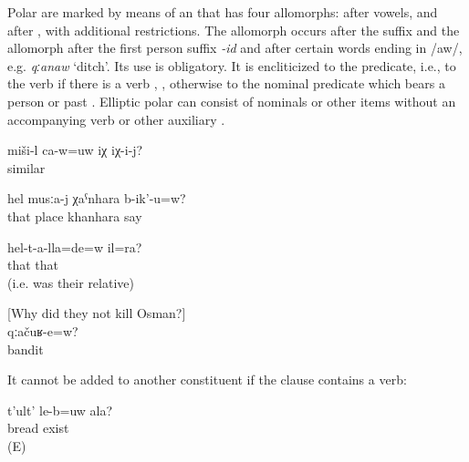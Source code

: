 Polar  are marked by means of an  that has four allomorphs:  after vowels, and  after , with additional restrictions. The allomorph  occurs after the  suffix  and the allomorph  after the first person suffix \textit{-id} and after certain words ending in /aw/, e.g. \textit{qːanaw} `ditch'. Its use is obligatory. It is encliticized to the predicate, i.e., to the verb if there is a verb , , otherwise to the nominal predicate which bears a person or past  . Elliptic polar  can consist of nominals or other items without an accompanying verb or other auxiliary . 
%
\begin{exe}
	\ex	\label{ex:Is this similar to him}
	\gll	miši-l	ca-w=uw	iχ	iχ-i-j?\\
		similar			\\
	\glt	{}

	\ex	\label{ex:Is this place called khanhara? Yes}
	\gll	hel	musːa-j	χaˁnhara	b-ik'-u=w?	\\
		that	place	khanhara	say	\\
	\glt	{}

	\ex	\label{ex:‎He also belonged to them? (i.e. was their relative)}
	\gll	hel-t-a-lla=de=w	il=ra?	\\
		that	that\\
	\glt	{} (i.e. was their relative)

	\ex	\label{ex:‎The bandits?}[Why did they not kill Osman?]\\
		\gll	qːačuʁ-e=w?	\\
			bandit	\\
		\glt	{}

\end{exe}

It cannot be added to another constituent if the clause contains a verb:
%
\begin{exe}
	\ex	\label{ex:Do you have bread}
	\begin{xlist}
		\ex	\label{ex:Do you have bread@A}
		\gll	t'ult'	le-b=uw	ala?\\
			bread	exist	\\
		\glt	{} (E)
	
		\ex	{} \label{ex:Do you have bread@B}
	\end{xlist}
\end{exe}

